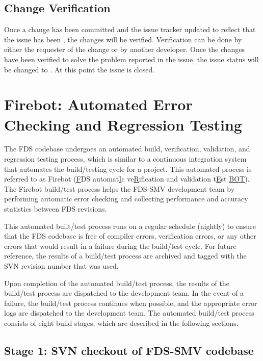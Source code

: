 \documentclass[11pt]{book}
\begin{document}
\subsection{Change Verification}

Once a change has been committed and the issue tracker updated to reflect that the issue has been ,
the changes will be verified.  Verification can be done by either the requester of the change or by another
developer.  Once the changes have been verified to solve the problem reported in the issue, the issue status will
be changed to .  At this point the issue is closed.

\clearpage
\section{Firebot: Automated Error Checking and Regression Testing}

The FDS codebase undergoes an automated build, verification, validation, and regression testing process, which is similar to a continuous integration system that automates the build/testing cycle for a project. This automated process is referred to as Firebot (\underline{F}DS automat\underline{I}c ve\underline{R}ification and validation t\underline{E}st \underline{BOT}). The Firebot build/test process helps the FDS-SMV development team by performing automatic error checking and collecting performance and accuracy statistics between FDS revisions.

This automated built/test process runs on a regular schedule (nightly) to ensure that the FDS codebase is free of compiler errors, verification errors, or any other errors that would result in a failure during the build/test cycle. For future reference, the results of a build/test process are archived and tagged with the SVN revision number that was used.

Upon completion of the automated build/test process, the results of the build/test process are dispatched to the development team. In the event of a failure, the build/test process continues when possible, and the appropriate error logs are dispatched to the development team. The automated build/test process consists of eight build stages, which are described in the following sections.

\subsection*{Stage 1: SVN checkout of FDS-SMV codebase}
\end{document}
